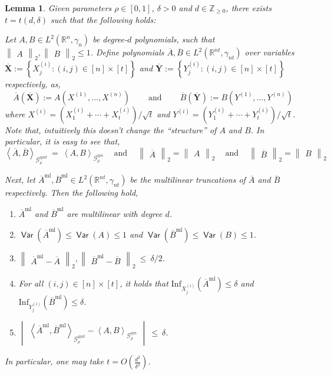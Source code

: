 \documentclass[11pt]{article}
\newcommand{\inbrace}[1]{\left \{ #1 \right \}}
\newcommand{\inparen}[1]{\left ( #1 \right )}
\newcommand{\inangle}[1]{\left \langle #1 \right \rangle}
\newcommand{\inabs}[1]{\begin{vmatrix} #1 \end{vmatrix}}
\newcommand{\norm}[2]{\begin{Vmatrix} #2 \end{Vmatrix}_{#1}}
\newcommand{\set}[1]{\inbrace{#1}}
\newcommand{\setdef}[2]{\set{#1 : #2}}
\DeclareMathOperator*{\Var}{\mathsf{Var}}
\newcommand{\sAND}{\ \mathrm{and} \ }
\newcommand{\bbR}{{\mathbb R}}
\newcommand{\bbZ}{{\mathbb Z}}
\newcommand{\bX}{\mathbf{X}}
\newcommand{\bY}{\mathbf{Y}}
\newcommand{\calG}{\mathcal{G}}
\newcommand{\Inf}{\mathrm{Inf}}
\newtheorem{lem}[theorem]{Lemma}
\newcommand{\ml}{\mathrm{ml}}
\begin{document}
\begin{lem}\label{lem:non-ml-to-ml}
	Given parameters $\rho \in [0,1]$, $\delta>0$ and $d \in \bbZ_{\ge 0}$, there exists $t = t(d, \delta)$ such that the following holds:
	
	Let $A, B \in L^2(\bbR^n, \gamma_n)$ be degree-$d$ polynomials, such that $\norm{2}{A}, \norm{2}{B} \le 1$. Define polynomials $\overline{A}, \overline{B} \in L^2(\bbR^{nt}, \gamma_{nt})$ over variables $\overline{\bX} := \setdef{X^{(i)}_j}{(i,j) \in [n] \times [t]}$ and $\overline{\bY} := \setdef{Y^{(i)}_j}{(i,j) \in [n] \times [t]}$ respectively, as,
	\[ \overline{A}\inparen{\overline{\bX}} := A(X^{(1)}, \ldots, X^{(n)}) \qquad \sAND \qquad \overline{B}\inparen{\overline{\bY}} := B(Y^{(1)}, \ldots, Y^{(n)})
	\]
	where $X^{(i)} = \inparen{X^{(i)}_1 + \cdots + X^{(i)}_t}/\sqrt{t}$ and $Y^{(i)} = \inparen{Y^{(i)}_1 + \cdots + Y^{(i)}_t}/\sqrt{t}$. Note that, intuitively this doesn't change the ``structure'' of $A$ and $B$. In particular, it is easy to see that,
	\[\inangle{\overline{A}, \overline{B}}_{\calG_\rho^{\otimes nt}} \ = \ \inangle{A, B}_{\calG_\rho^{\otimes n}} \quad \sAND \quad \norm{2}{\overline{A}} = \norm{2}{A} \quad \sAND \quad \norm{2}{\overline{B}} = \norm{2}{B}\]
	
	\noindent Next, let $\overline{A}^{\ml}, \overline{B}^{\ml} \in L^2(\bbR^{nt}, \gamma_{nt})$ be the multilinear truncations of $\overline{A}$ and $\overline{B}$ respectively. Then the following hold,
	\begin{enumerate}
		\item $\overline{A}^{\ml}$ and $\overline{B}^{\ml}$ are multilinear with degree $d$.
		\item $\Var(\overline{A}^{\ml}) \le \Var(A) \le 1$ and $\Var(\overline{B}^{\ml}) \le \Var(B) \le 1$.
		\item $\norm{2}{\overline{A}^{\ml} - \overline{A}}, \norm{2}{\overline{B}^{\ml} - \overline{B}} ~\le~ \delta/2$.
		\item For all $(i,j) \in [n] \times [t]$, it holds that $\Inf_{X^{(i)}_j}\inparen{\overline{A}^{\mathrm{ml}}} \le \delta$ and $\Inf_{Y^{(i)}_j}\inparen{\overline{B}^{\mathrm{ml}}} \le \delta$.
		\item $\inabs{\inangle{\overline{A}^{\mathrm{ml}}, \overline{B}^{\mathrm{ml}}}_{\calG_\rho^{\otimes nt}} - \inangle{A, B}_{\calG_\rho^{\otimes n}}} ~\le~ \delta$.
	\end{enumerate}
	In particular, one may take $t = O\inparen{\frac{d^2}{\delta^2}}$.
\end{lem}
\end{document}
